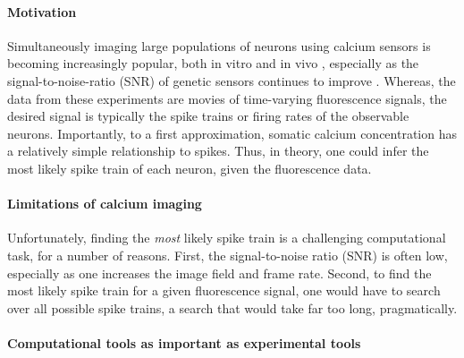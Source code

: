 \paragraph{Motivation}

Simultaneously imaging large populations of neurons using calcium sensors is becoming increasingly popular, both in vitro  \cite{YusteKonnerth06} and in vivo \cite{NagayamaChen07, GobelHelmchen07, LuoSvoboda08}, especially as the signal-to-noise-ratio (SNR) of genetic sensors continues to improve \cite{GaraschukKonnerth07, MankGriesbeck08, WallaceHasan08}. Whereas, the data from these experiments are movies of time-varying fluorescence signals, the desired signal is typically the spike trains or firing rates of the observable neurons.  Importantly, to a first approximation, somatic calcium concentration has a relatively simple relationship to spikes.  Thus, in theory, one could infer the most likely spike train of each neuron, given the fluorescence data.  

\paragraph{Limitations of calcium imaging}

Unfortunately, finding the \emph{most} likely spike train is a challenging computational task, for a number of reasons.  First, the signal-to-noise ratio (SNR) is often low, especially as one increases the image field and frame rate.  Second, to find the most likely spike train for a given fluorescence signal, one would have to search over all possible spike trains, a search that would take far too long, pragmatically.  

\paragraph{Computational tools as important as experimental tools}

